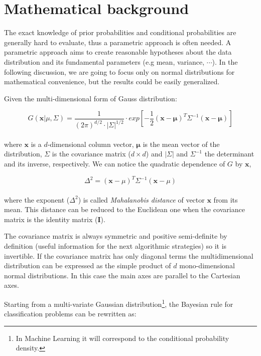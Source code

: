 \documentclass{standalone}
\begin{document}
\section*{Mathematical background}

The exact knowledge of prior probabilities and conditional probabilities are generally hard to evaluate, thus a parametric approach is often needed.
A parametric approach aims to create reasonable hypotheses about the data distribution and its fundamental parameters (e.g mean, variance, $\cdots$).
In the following discussion, we are going to focus only on normal distributions for mathematical convenience, but the results could be easily generalized.

Given the multi-dimensional form of Gauss distribution:

\begin{equation}
G(\mathbf{x}|\mu, \Sigma) = \frac{1}{(2\pi)^{d/2}\cdot\left|\Sigma\right|^{1/2}}\cdot exp\left[-\frac{1}{2}(\mathbf{x}-\mathbf{\mu})^T\Sigma^{-1}(\mathbf{x}-\mathbf{\mu})\right]
\end{equation}
\\
where $\mathbf{x}$ is a $d$-dimensional column vector, $\mathbf{\mu}$ is the mean vector of the distribution, $\Sigma$ is the covariance matrix ($d\times d$) and $|\Sigma|$ and $\Sigma^{-1}$ the determinant and its inverse, respectively.
We can notice the quadratic dependence of $G$ by $\mathbf{x}$,

\begin{equation}
\Delta^2 = (\mathbf{x}-\mu)^T\Sigma^{-1}(\mathbf{x}-\mu)
\end{equation}
\\
where the exponent ($\Delta^2$) is called \emph{Mahalanobis distance} of vector $\mathbf{x}$ from its mean.
This distance can be reduced to the Euclidean one when the covariance matrix is the identity matrix ($\mathbf{I}$).

The covariance matrix is always symmetric and positive semi-definite by definition (useful information for the next algorithmic strategies) so it is invertible.
If the covariance matrix has only diagonal terms the multidimensional distribution can be expressed as the simple product of $d$ mono-dimensional normal distributions.
In this case the main axes are parallel to the Cartesian axes.

Starting from a multi-variate Gaussian distribution\footnote{
  In Machine Learning it will correspond to the conditional probability density.
}, the Bayesian rule for classification problems can be rewritten as:
\end{document}
